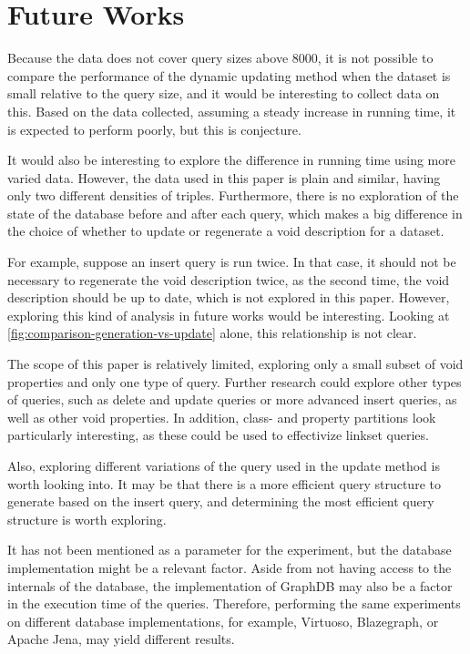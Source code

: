 \section{Future Works}\label{sec:future-works}
Because the data does not cover query sizes above 8000, it is not possible to compare the performance of the dynamic updating method when the dataset is small relative to the query size, and it would be interesting to collect data on this. Based on the data collected, assuming a steady increase in running time, it is expected to perform poorly, but this is conjecture.

It would also be interesting to explore the difference in running time using more varied data. However, the data used in this paper is plain and similar, having only two different densities of triples. Furthermore, there is no exploration of the state of the database before and after each query, which makes a big difference in the choice of whether to update or regenerate a \gls{void} description for a dataset.

For example, suppose an insert query is run twice. In that case, it should not be necessary to regenerate the \gls{void} description twice, as the second time, the \gls{void} description should be up to date, which is not explored in this paper. However, exploring this kind of analysis in future works would be interesting. Looking at \autoref{fig:comparison-generation-vs-update} alone, this relationship is not clear.

The scope of this paper is relatively limited, exploring only a small subset of \gls{void} properties and only one type of query. Further research could explore other types of queries, such as delete and update queries or more advanced insert queries, as well as other \gls{void} properties. In addition, class- and property partitions look particularly interesting, as these could be used to effectivize linkset queries.

Also, exploring different variations of the query used in the update method is worth looking into. It may be that there is a more efficient query structure to generate based on the insert query, and determining the most efficient query structure is worth exploring.

It has not been mentioned as a parameter for the experiment, but the database implementation might be a relevant factor. Aside from not having access to the internals of the database, the implementation of GraphDB may also be a factor in the execution time of the queries. Therefore, performing the same experiments on different database implementations, for example, Virtuoso, Blazegraph, or Apache Jena, may yield different results.